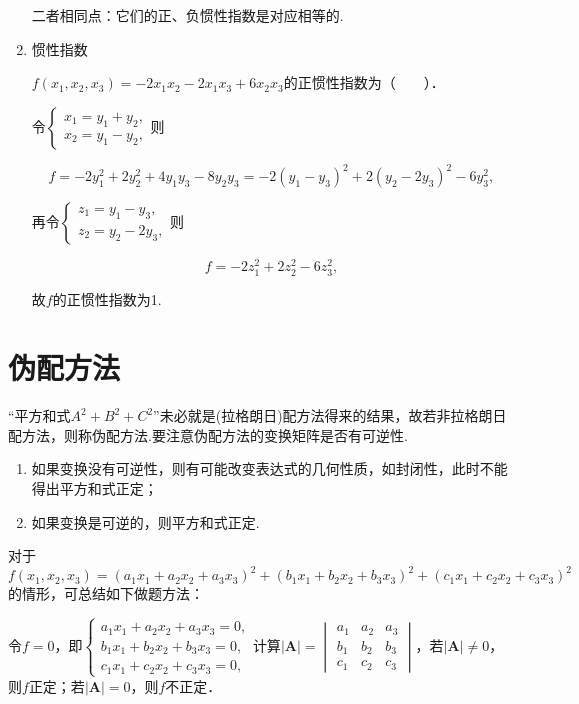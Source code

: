 \begin{enumerate}
          二者相同点：它们的正、负惯性指数是对应相等的.
    \item 惯性指数
          \begin{example}{}{}
              $f(x_{1},x_{2},x_{3})=-2x_{1}x_{2}-2x_{1}x_{3}+6x_{2}x_{3}$的正惯性指数为（　　）．
          \end{example}
          \begin{solution}
              令$\begin{cases}x_{1}=y_{1}+y_{2},\\x_{2}=y_{1}-y_{2},\end{cases}$则

              $$f=-2y_{1}^{2}+2y_{2}^{2}+4y_{1}y_{3}-8y_{2}y_{3}
                  =-2(y_{1}-y_{3})^{2}+2(y_{2}-2y_{3})^{2}-6y_{3}^{2},$$

              再令$\begin{cases}z_{1}=y_{1}-y_{3},\\z_{2}=y_{2}-2y_{3},\end{cases}$则

              $$f=-2z_{1}^{2}+2z_{2}^{2}-6z_{3}^{2},$$

              故$f$的正惯性指数为1.
          \end{solution}
\end{enumerate}

\section{伪配方法}
\DTwoThree

“平方和式$A^2+B^2+C^2$”未必就是(拉格朗日)配方法得来的结果，故若非拉格朗日配方法，则称伪配方法.要注意伪配方法的变换矩阵是否有可逆性.
\begin{enumerate}
    \item 如果变换没有可逆性，则有可能改变表达式的几何性质，如封闭性，此时不能得出平方和式正定；
    \item 如果变换是可逆的，则平方和式正定.
\end{enumerate}


\begin{note}{}{}
    对于$f(x_{1},x_{2},x_{3})=(a_{1}x_{1}+a_{2}x_{2}+a_{3}x_{3})^{2}+(b_{1}x_{1}+b_{2}x_{2}+b_{3}x_{3})^{2}+(c_{1}x_{1}+c_{2}x_{2}+c_{3}x_{3})^{2}$的情形，可总结如下做题方法：

    令$f=0$，即$\begin{cases}a_{1}x_{1}+a_{2}x_{2}+a_{3}x_{3}=0,\\b_{1}x_{1}+b_{2}x_{2}+b_{3}x_{3}=0,\\c_{1}x_{1}+c_{2}x_{2}+c_{3}x_{3}=0,\end{cases}$计算$|\boldsymbol{A}|=\begin{vmatrix}a_{1}&a_{2}&a_{3}\\b_{1}&b_{2}&b_{3}\\c_{1}&c_{2}&c_{3}\end{vmatrix}$，若$|\boldsymbol{A}|\neq0$，则$f$正定；若$|\boldsymbol{A}|=0$，则$f$不正定．
\end{note}
